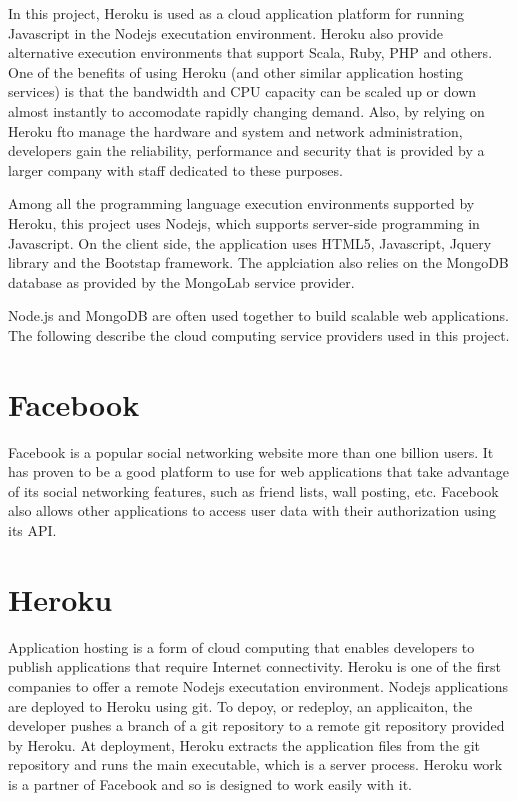 In this project, Heroku is used as a cloud application platform for running Javascript in the Nodejs executation environment. Heroku also provide alternative execution environments that support Scala, Ruby, PHP and others.  One of the benefits of using Heroku (and other similar application hosting services) is that the bandwidth and CPU capacity can be scaled up or down almost instantly to accomodate rapidly changing demand.  Also, by relying on Heroku fto manage the hardware and system and network administration, developers gain the reliability, performance and security that is provided by a larger company with staff dedicated to these purposes.

Among all the programming language execution environments supported by Heroku, this project uses Nodejs, which supports server-side programming in Javascript. On the client side, the application uses HTML5, Javascript, Jquery library and the Bootstap framework. The applciation also relies on the MongoDB database as provided by the MongoLab service provider.

Node.js and MongoDB are often used together to build scalable web applications. The following describe the cloud computing service providers used in this project.

\section{Facebook}
Facebook is a popular social networking website more than one billion users. It has proven to be a good platform to use for web applications that take advantage of its social networking features, such as friend lists, wall posting, etc. Facebook also allows other applications to access user data with their authorization using its API. \cite{Facebook}

\section{Heroku}
Application hosting is a form of cloud computing that enables developers to publish applications that require Internet connectivity. Heroku is one of the first companies to offer a remote Nodejs executation environment.  Nodejs applications are deployed to Heroku using git.  To depoy, or redeploy, an applicaiton, the developer pushes a branch of a git repository to a remote git repository provided by Heroku.  At deployment, Heroku extracts the application files from the git repository and runs the main executable, which is a server process.  Heroku work is a partner of Facebook and so is designed to work easily with it. \cite{Heroku}

